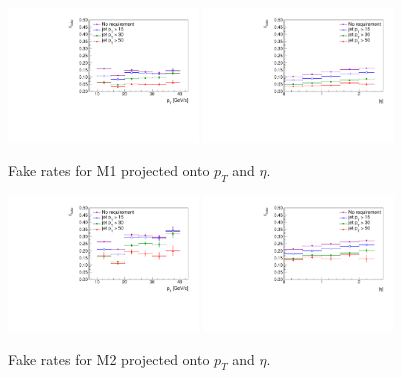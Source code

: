 \begin{figure}[!htbp]
\begin{center}
\includegraphics[width=0.45\textwidth]{figures/muon_frpt_jetscan_m1.pdf}
\includegraphics[width=0.45\textwidth]{figures/muon_freta_jetscan_m1.pdf}
\caption{Fake rates for M1 projected onto $p_T$ and $\eta$.}
\label{fig:mu_fr_iso1}
\end{center}
\end{figure}

\begin{figure}[!htbp]
\begin{center}
\includegraphics[width=0.45\textwidth]{figures/muon_frpt_jetscan_m2.pdf}
\includegraphics[width=0.45\textwidth]{figures/muon_freta_jetscan_m2.pdf}
\caption{Fake rates for M2 projected onto $p_T$ and $\eta$.}
\label{fig:mu_fr_iso04}

\end{center}
\end{figure}
